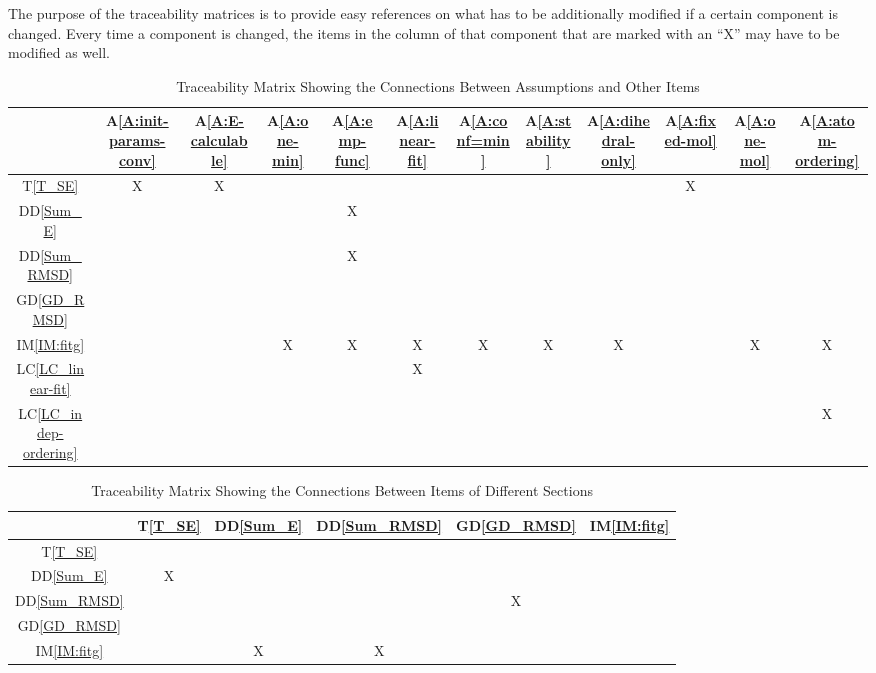 \documentclass[12pt]{article}
\newcommand{\dref}[1]{GD\ref{#1}}
\newcommand{\ddref}[1]{DD\ref{#1}}
\newcommand{\tref}[1]{T\ref{#1}}
\newcommand{\aref}[1]{A\ref{#1}}
\newcommand{\iref}[1]{IM\ref{#1}}
\newcommand{\lcref}[1]{LC\ref{#1}}
\begin{document}
The purpose of the traceability matrices is to provide easy references on what
has to be additionally modified if a certain component is changed.  Every time a
component is changed, the items in the column of that component that are marked
with an ``X'' may have to be modified as well. 



\begin{table}[h!]
\centering
\label{Table:A_trace}
\begin{tabular}{|c|c|c|c|c|c|c|c|c|c|c|c|}
\hline
	& \aref{A:init-params-conv} 
	& \aref{A:E-calculable}
	& \aref{A:one-min}
	& \aref{A:emp-func}
	& \aref{A:linear-fit}
	& \aref{A:conf=min}
	& \aref{A:stability}
	& \aref{A:dihedral-only}
	& \aref{A:fixed-mol}
	& \aref{A:one-mol}
	& \aref{A:atom-ordering} \\
\hline
\tref{T_SE}               &X&X& & & & & & &X& & \\ \hline
\ddref{Sum_E}             & & & &X& & & & & & & \\ \hline
\ddref{Sum_RMSD}          & & & &X& & & & & & & \\ \hline
\dref{GD_RMSD}            & & & & & & & & & & & \\ \hline
\iref{IM:fitg}            & & &X&X&X&X&X&X& &X&X\\ \hline
\lcref{LC_linear-fit}     & & & & &X& & & & & & \\ \hline
\lcref{LC_indep-ordering} & & & & & & & & & & &X\\ \hline
\end{tabular}
\caption{Traceability Matrix Showing the Connections Between Assumptions and Other Items}

\end{table}



\begin{table}[H]
	\centering
	\label{Table:trace}
	\begin{tabular}{|c|c|c|c|c|c|}
		\hline        
		& \tref{T_SE} 
		& \ddref{Sum_E}
		& \ddref{Sum_RMSD}
		& \dref{GD_RMSD}
		& \iref{IM:fitg} \\
		\hline
		\tref{T_SE} & & & & & \\ \hline
		\ddref{Sum_E} & X & & & &  \\ \hline
		\ddref{Sum_RMSD} & & & & X & \\ \hline
		\dref{GD_RMSD} & & & & & \\ \hline
		\iref{IM:fitg} & & X & X & & \\
		\hline
	\end{tabular}
	\caption{Traceability Matrix Showing the Connections Between Items of 
	Different Sections}
\end{table}
\end{document}
